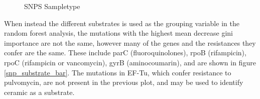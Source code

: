 \begin{figure}[h]
    \centering
    \caption{SNPS Sampletype}
    \label{snps_sampletype}
\end{figure}

When instead the different substrates is used as the grouping variable in the random forest analysis, the mutations with the highest mean decrease gini importance are not the same, however many of the genes and the resistances they confer are the same. These include parC (fluoroquinolones), rpoB (rifampicin), rpoC (rifampicin or vancomycin), gyrB (aminocoumarin), and are shown in figure \ref{snp_substrate_bar}. The mutations in EF-Tu, which confer resistance to pulvomycin, are not present in the previous plot, and may be used to identify ceramic as a substrate.

